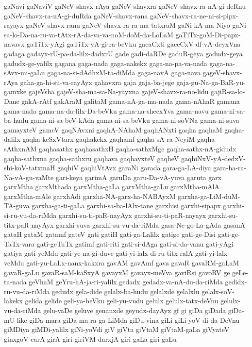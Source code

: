 {gaNavi
gaNaviV
gaNeV-shavx-rAya
gaNeV-shavxra
gaNeV-shavx-ra-nA-gi-deRnu
gaNeV-shavx-ra-nA-gi-duRda
gaNeV-shavx-rana
gaNeV-shavx-ra-ne-ni-si-pipx-rayayx
gaNeV-shavx-ranu
gaNeV-shavx-ra-ra-ma-tatxraM
gaNi-kA-ma-Niyo
gaNi-sa-lo-Da-na-ru-va-tAtx-rA-da-va-va-noM-doM-da-LoLaM
gaTiTx-goM-Di-papx-navavx
gaTiTx-yAgi
gaTiTx-yA-gi-ra-beVku
gacaCxti
gaceCxV-df-vA-deyxVna
gadaga
gadayx-rU-pa-da-lilx-dadxrU
gade
gadi-daRDe
gaduR-geya
gadudx-geya
gadudx-ge-yalilx
gagana
gaga-nada
gaga-nakekx
gaga-na-pa-va-nada
gaga-na-sAvx-mi-gaLu
gaga-na-si-dAdhxM-ta-diMda
gaga-navA
gaga-nava
gageV-shavx-rAya
gaha-ga-hi-su-va-rayAyx
gahavxra
gaja
gaja-ba-jege
gaja-gu-Na-ga-BaR-yu-gamxke
gajeVsha
gajeV-sha-ma-sa-Na-yayxna
gajeV-shavx-ra-no-lidu
gajiR-sa-lo-Dane
gakA-rAtf
gakAraM
galitaM
gama-nA-ga-ma-nada
gama-nAhaR
gamana
gama-nada
gama-na-da-lilx-Da-beVku
gama-na-shecxYva
gama-navu
gama-ni-sa-ba-hudu
gama-ni-sa-beV-kAda
gama-ni-sa-beVku
gama-ni-soVNa
gama-ni-suva
gamayxteV
gameV
gaqNAvxni
gaqhA-NAhaM
gaqhANxti
gaqha
gaqhaM
gaqha-dalilx
gaqha-keSxVtarx
gaqhakekx
gaqhamf
gaqha-sA-ra-NeyiM
gaqha-sAthxnAM
gaqhasathx
gaqhasathxH
gaqha-sathxMge
gaqha-sathx-nA-gidudx
gaqha-sathxna
gaqha-sathxru
gaqhava
gaqhayxteV
gaqheV
gaqhiNxV-yA-dedxV-shi-koV-tatxmaH
gaqhiV
gaqhiVtAvx
garaNi
garada
gara-ga-LA-diya
gara-ha-ra-Na-vA-gu-vaMte
gari-keya
garimA
garuDa
garu-Da-vA-yuva
garuta
garx
garxMtha
garxMthada
garxMtha-gaLa
garxMtha-gaLu
garxMtha-mAlA
garxMtha-mAle
garxhAdi
garxha-NA-garx-ha-NABAyxM
garxha-ga-LiM-duM-TA-guva
garxha-ga-ti-gaLa
garxhi-sa-ba-lAlx-tane
garxhisi
garxhi-sipapx
garxhi-si-ru-vu-da-riMda
garxhi-su-ti-paR-nayAyx
garxhi-su-ti-paR-nayayx
garxhi-su-titx-paR-nayAyx
garxhi-suva
garxhi-su-vu-da-riMda
gasa-Ne-go-La-gAda
gasanA
gataH
gataM
gatamf
gateV
gati
gatiH
gati-ga-Lalilx
gatige
gati-ge-Disi
gati-ge-TaTx-vara
gati-geTuTx
gatimf
gati-riti
gati-si-dAga
gati-si-da-vanu
gati-yAgi
gatiya
gati-yeMdu
gati-ye-na-gi-duve
gati-yi-lalx-di-ru-titx-ralA
gati-yi-lalx-veMdu
gati-yu-LaLx-nanx-kakxra
gavAM
gavAmf
gava
gavaR
gavaRM-gaLaM
gavaR-gaLu
gavaR-saM-kaSxyA
gavayxM
gavayx-meVva
gaviRsi
gavoRV
ge
geLe-ta-nada
geVhaM
geYru-hA-ja-ri-yalilx
gedadx
gedadx-va-nA-du-da-riMda
gedidx-ru-vu-da-riMda
gedudx
gela-dide
gelalx-ba-hudu
gelalxde
gelalxlu
gelalx-soV-lakekx
gelida
gelide
geli-ya-beVku
geli-yu-vudu
gelulx
gelulx-tatx-deVnu
gelulx-vu-da-riMda
gelu-vaDe
geluve
genanxde
geyudx-dayAyx
gf
gi
giDa
giDada
giDa-mU-like
giDa-mara
giDa-ma-ra-ga-LiMda
giDu-vina
giLi
giLi-yoV-di-da-DeVnu
giMDiya
giMDi-yalilx
giNi-yoVdi
giV
giVta
giVtaM
giVtaM-gaLa
giVyateV
ginxgoV-carA
girA
giri
giriVM-darxjA
giri-gaLa
giri-gaLu
}
